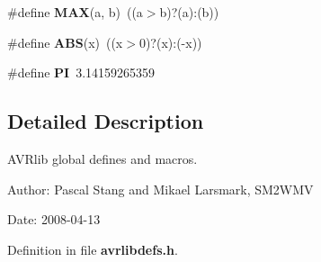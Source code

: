 \begin{CompactItemize}
\item 
\#define \textbf{MAX}(a, b)~((a$>$b)?(a):(b))\label{avrlibdefs_8h_fa99ec4acc4ecb2dc3c2d05da15d0e3f}

\item 
\#define \textbf{ABS}(x)~((x$>$0)?(x):(-x))\label{avrlibdefs_8h_996f7be338ccb40d1a2a5abc1ad61759}

\item 
\#define \textbf{PI}~3.14159265359\label{avrlibdefs_8h_598a3330b3c21701223ee0ca14316eca}

\end{CompactItemize}


\subsection{Detailed Description}
AVRlib global defines and macros. 

\begin{Desc}
\item[Author:]Pascal Stang and Mikael Larsmark, SM2WMV \end{Desc}
\begin{Desc}
\item[Date:]2008-04-13 \end{Desc}


Definition in file {\bf avrlibdefs.h}.